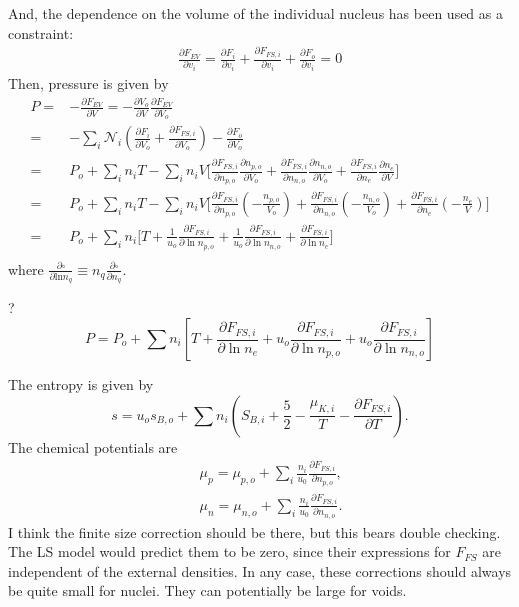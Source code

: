 \documentclass[11pt,letter]{article}
\begin{document}
And, the dependence on the volume of the individual nucleus has been used as a constraint:
\begin{equation}
 \begin{split}
  \frac{\partial F_{EV}}{\partial v_i}=\frac{\partial F_i}{\partial v_i} + \frac{\partial F_{FS,i}}{\partial v_i} + \frac{\partial F_o}{\partial v_i} = 0
 \end{split}
\end{equation}
Then, pressure is given by
\begin{equation}
 \begin{split}
  P =& -\frac{\partial F_{EV}}{\partial V} =-\frac{\partial V_o}{\partial V}\frac{\partial F_{EV}}{\partial V_o}\\
  =& -\sum_i \mathcal{N}_i (\frac{\partial F_i}{\partial V_o}+\frac{\partial F_{FS,i}}{\partial V_o})-\frac{\partial F_o}{\partial V_o}\\
  =& P_o+\sum_i n_i T -\sum_i n_i V \Big [\frac{\partial F_{FS,i}}{\partial n_{p,o}} \frac{\partial n_{p,o}}{\partial V_o}+\frac{\partial F_{FS,i}}{\partial n_{n,o}} \frac{\partial n_{n,o}}{\partial V_o}+\frac{\partial F_{FS,i}}{\partial n_{e}} \frac{\partial n_{e}}{\partial V}\Big]\\
  =& P_o+\sum_i n_i T -\sum_i n_i V \Big [\frac{\partial F_{FS,i}}{\partial n_{p,o}} (-\frac{n_{p,o}}{V_o})+\frac{\partial F_{FS,i}}{\partial n_{n,o}} (-\frac{n_{n,o}}{V_o})+\frac{\partial F_{FS,i}}{\partial n_{e}} (-\frac{n_{e}}{V})\Big]\\
  =&P_o +\sum_i n_i \Big [T+\frac{1}{u_o} \frac{\partial F_{FS,i}}{\partial \ln n_{p,o}}+\frac{1}{u_o}\frac{\partial F_{FS,i}}{\partial \ln n_{n,o}}+\frac{\partial F_{FS,i}}{\partial \ln n_{e}}\Big ]\\
 \end{split}
\end{equation}
where $\frac{\partial \square }{\partial \text{ln}n_q } \equiv n_q \frac{\partial \square }{\partial n_q }$.

{\color{red} ?
\begin{equation}
P = P_o + \sum n_i \left[ T + \frac{\partial F_{FS,i}}{\partial \ln n_e} 
+ u_o \frac{\partial F_{FS,i}}{\partial \ln n_{p,o}} 
+ u_o \frac{\partial F_{FS,i}}{\partial \ln n_{n,o}} \right]  
\end{equation}}

The entropy is given by 
\begin{equation}
s = u_o s_{B,o} + \sum n_i \left(S_{B,i} + \frac{5}{2} - \frac{\mu_{K,i}}{T} 
- \frac{\partial F_{FS,i}}{\partial T}\right).
\end{equation}
The chemical potentials are 
\begin{eqnarray}
&& \mu_p = \mu_{p,o} + \sum_i \frac{n_i}{u_0} \frac{\partial F_{FS,i}}{\partial n_{p,o}}, \\
&& \mu_n = \mu_{n,o} + \sum_i \frac{n_i}{u_0} \frac{\partial F_{FS,i}}{\partial n_{n,o}}.
\end{eqnarray}
I think the finite size correction should be there, but this bears double
checking.  The LS model would predict them to be zero, since their expressions for
$F_{FS}$ are independent of the external densities.  In any case, these 
corrections should always be quite small for nuclei.  They can potentially be 
large for voids.
\end{document}

